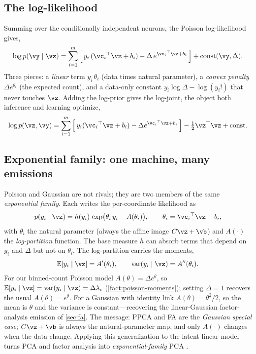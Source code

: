 \documentclass[11pt]{article}
\theoremstyle{plain}
\theoremstyle{definition}
\theoremstyle{remark}
\theoremstyle{definition}
\newcommand{\E}{\mathbb{E}}
\begin{document}
\subsection{The log-likelihood}

Summing over the conditionally independent neurons, the Poisson log-likelihood gives,
\begin{equation}\label{eq:expfam-loglik}
    \log p(\vy \mid \vz) = \sum_{i=1}^m \Big[\, y_i\,(\vc_i\trp\vz + b_i)
        - \Delta\, e^{\vc_i\trp\vz + b_i} \,\Big] + \mathrm{const}(\vy, \Delta) .
\end{equation}
Three pieces: a \emph{linear} term $y_i\,\theta_i$ (data times natural
parameter), a \emph{convex penalty} $\Delta e^{\theta_i}$ (the expected count),
and a data-only constant $y_i\log\Delta - \log(y_i!)$ that never touches $\vz$.
Adding the log-prior gives the log-joint, the object both inference and learning
optimize,
\begin{equation}\label{eq:expfam-logjoint}
    \log p(\vz, \vy) = \sum_{i=1}^m \Big[\, y_i(\vc_i\trp\vz + b_i)
        - \Delta e^{\vc_i\trp\vz + b_i} \,\Big] - \tfrac12 \vz\trp\vz + \mathrm{const} .
\end{equation}

\subsection{Exponential family: one machine, many emissions}

Poisson and Gaussian are not rivals; they are two members of the same
\emph{exponential family}. Each writes the per-coordinate likelihood as
\begin{equation}\label{eq:expfam-form}
    p(y_i \mid \vz) = h(y_i)\,\exp\!\big(\theta_i\, y_i - A(\theta_i)\big),
    \qquad \theta_i = \vc_i\trp\vz + b_i,
\end{equation}
with $\theta_i$ the natural parameter (always the affine image $C\vz + \vb$) and
$A(\cdot)$ the \emph{log-partition} function. The base measure $h$ can absorb
terms that depend on $y_i$ and $\Delta$ but not on $\theta_i$. The log-partition
carries the moments,
\begin{equation}\label{eq:expfam-moments}
    \E[y_i \mid \vz] = A'(\theta_i), \qquad \var(y_i \mid \vz) = A''(\theta_i) .
\end{equation}
For our binned-count Poisson model $A(\theta) = \Delta e^{\theta}$, so
$\E[y_i\mid\vz] = \var(y_i\mid\vz) = \Delta\lambda_i$
(\cref{fact:poisson-moments}); setting $\Delta=1$ recovers the usual
$A(\theta)=e^\theta$. For a Gaussian with
identity link $A(\theta) = \theta^2/2$, so the mean is $\theta$ and the variance
is constant---recovering the linear-Gaussian factor-analysis emission of
\cref{sec:fa}. The message: PPCA and FA are the \emph{Gaussian special case};
$C\vz + \vb$ is always the natural-parameter map, and only $A(\cdot)$ changes when
the data change. Applying this generalization to the latent linear model turns
PCA and factor analysis into \emph{exponential-family} PCA
\parencite{Collins2001-ef,Ghahramani2009-of}.
\end{document}
